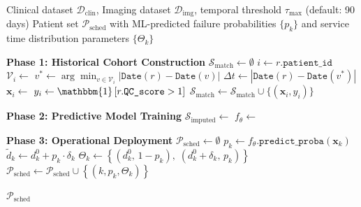 \documentclass[11pt,a4paper]{article}
\begin{document}
\begin{algorithm}[H]
\caption{Asynchronous Data Alignment and Stochastic Parameterization}
\label{alg:data_pipeline}
\begin{algorithmic}[1]
\Require Clinical dataset $\mathcal{D}_{\text{clin}}$, Imaging dataset $\mathcal{D}_{\text{img}}$, temporal threshold $\tau_{\max}$ (default: 90 days)
\Ensure Patient set $\mathcal{P}_{\text{sched}}$ with ML-predicted failure probabilities $\{p_k\}$ and service time distribution parameters $\{\Theta_k\}$

\Statex \textbf{Phase 1: Historical Cohort Construction}
\State $\mathcal{S}_{\text{match}} \gets \emptyset$ 
    \State $i \gets r.\texttt{patient\_id}$
    \State $\mathcal{V}_i \gets$  
    \State $v^* \gets \arg\min_{v \in \mathcal{V}_i} \left| \texttt{Date}(r) - \texttt{Date}(v) \right|$
    \State $\Delta t \gets \left| \texttt{Date}(r) - \texttt{Date}(v^*) \right|$
        \State $\mathbf{x}_i \gets$  
        \State $y_i \gets \mathbbm{1}\left[ r.\texttt{QC\_score} > 1 \right]$ 
        \State $\mathcal{S}_{\text{match}} \gets \mathcal{S}_{\text{match}} \cup \{(\mathbf{x}_i, y_i)\}$
    \EndIf
\EndFor

\Statex \textbf{Phase 2: Predictive Model Training}
\State $\mathcal{S}_{\text{imputed}} \gets$  
\State $f_{\theta} \gets$ 

\Statex \textbf{Phase 3: Operational Deployment}
\State $\mathcal{P}_{\text{sched}} \gets \emptyset$
    \State $p_k \gets f_{\theta}.\texttt{predict\_proba}(\mathbf{x}_k)$ 
    \State $\tilde{d}_k \gets d_k^0 + p_k \cdot \delta_k$ 
    \State $\Theta_k \gets \left\{ (d_k^0,\, 1 - p_k),\; (d_k^0 + \delta_k,\, p_k) \right\}$ 
    \State $\mathcal{P}_{\text{sched}} \gets \mathcal{P}_{\text{sched}} \cup \left\{ (k, p_k, \Theta_k) \right\}$
\EndFor

\State \Return $\mathcal{P}_{\text{sched}}$
\end{algorithmic}
\end{algorithm}
 
\end{document}
